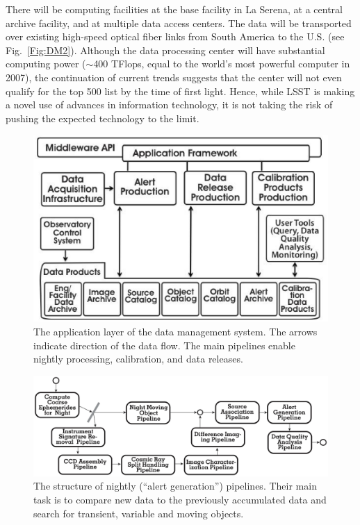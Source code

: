 \documentclass{emulateapj}
\begin{document}
There will be computing facilities at the base facility in La Serena,
at a central archive facility, and at multiple data access 
centers. The data will be transported over existing high-speed optical fiber 
links from South America to the U.S. (see Fig.~\ref{Fig:DM2}).
Although the data processing center will have substantial computing power ($\sim$400 
TFlops, equal to the world's most powerful computer in 2007), the continuation of 
current trends suggests that the center will 
not even qualify for the top 500 list by the time of first light.
Hence, while LSST is making a novel use of advances in information technology, 
it is not taking the risk of pushing the expected technology to the limit.  


\begin{figure}[t!]
\hskip -0.1in
\includegraphics[width=1.15\hsize,clip]{DMp2.ps}
\vskip -0.3in
\caption{The application layer of the data management system. The arrows indicate
direction of the data flow. The main pipelines enable nightly processing,
calibration, and data releases.} 
\label{Fig:DM4}
\end{figure}

\begin{figure}
\includegraphics[width=1.0\hsize,clip]{DMp4.ps}
\caption{The structure of nightly (``alert generation'') pipelines. 
Their main task is to compare new data to the previously accumulated data and search for 
transient, variable and moving objects.} 
\label{Fig:DM5}
\end{figure}
\end{document}
